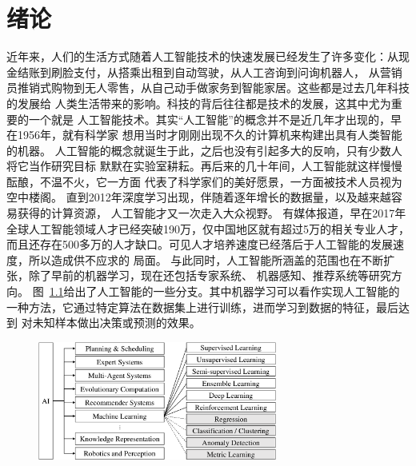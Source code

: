 \chapter{绪论}\label{chap:introduction}
近年来，人们的生活方式随着人工智能技术的快速发展已经发生了许多变化：从现金结账到刷脸支付，从搭乘出租到自动驾驶，从人工咨询到问询机器人，
从营销员推销式购物到无人零售，从自己动手做家务到智能家居。这些都是过去几年科技的发展给
人类生活带来的影响。科技的背后往往都是技术的发展，这其中尤为重要的一个就是
人工智能技术。其实``人工智能''的概念并不是近几年才出现的，早在1956年，就有科学家
想用当时才刚刚出现不久的计算机来构建出具有人类智能的机器。
人工智能的概念就诞生于此，之后也没有引起多大的反响，只有少数人将它当作研究目标
默默在实验室耕耘。再后来的几十年间，人工智能就这样慢慢酝酿，不温不火，它一方面
代表了科学家们的美好愿景，一方面被技术人员视为空中楼阁。
直到2012年深度学习出现，伴随着逐年增长的数据量，以及越来越容易获得的计算资源，
人工智能才又一次走入大众视野。
有媒体报道，早在2017年全球人工智能领域人才已经突破190万，仅中国地区就有超过5万的相关专业人才，而且还存在500多万的人才缺口。可见人才培养速度已经落后于人工智能的发展速度，所以造成供不应求的
局面。
与此同时，人工智能所涵盖的范围也在不断扩张，除了早前的机器学习，现在还包括专家系统、
机器感知、推荐系统等研究方向。
图~\ref{fig:ai}给出了人工智能的一些分支。其中机器学习可以看作实现人工智能的
一种方法，它通过特定算法在数据集上进行训练，进而学习到数据的特征，最后达到
对未知样本做出决策或预测的效果。
\begin{figure}[htbp]
  \centering
  \includegraphics[width=0.7\textwidth]{Img/ai-content.pdf}
  \label{fig:ai}
\end{figure}

